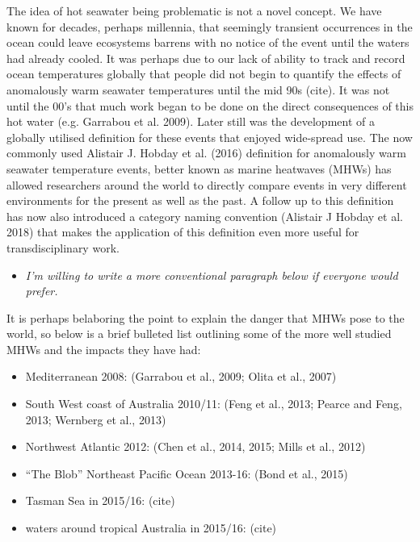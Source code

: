 \documentclass[]{article}
\providecommand{\tightlist}{%
  \setlength{\itemsep}{0pt}\setlength{\parskip}{0pt}}
\begin{document}
The idea of hot seawater being problematic is not a novel concept. We
have known for decades, perhaps millennia, that seemingly transient
occurrences in the ocean could leave ecosystems barrens with no notice
of the event until the waters had already cooled. It was perhaps due to
our lack of ability to track and record ocean temperatures globally that
people did not begin to quantify the effects of anomalously warm
seawater temperatures until the mid 90s (cite). It was not until the
00's that much work began to be done on the direct consequences of this
hot water (e.g. Garrabou et al. 2009). Later still was the development
of a globally utilised definition for these events that enjoyed
wide-spread use. The now commonly used Alistair J. Hobday et al. (2016)
definition for anomalously warm seawater temperature events, better
known as marine heatwaves (MHWs) has allowed researchers around the
world to directly compare events in very different environments for the
present as well as the past. A follow up to this definition has now also
introduced a category naming convention (Alistair J Hobday et al. 2018)
that makes the application of this definition even more useful for
transdisciplinary work.

\begin{itemize}
\tightlist
\item
  \emph{I'm willing to write a more conventional paragraph below if
  everyone would prefer.}
\end{itemize}

It is perhaps belaboring the point to explain the danger that MHWs pose
to the world, so below is a brief bulleted list outlining some of the
more well studied MHWs and the impacts they have had:

\begin{itemize}
\tightlist
\item
  Mediterranean 2008: (Garrabou et al., 2009; Olita et al., 2007)
\item
  South West coast of Australia 2010/11: (Feng et al., 2013; Pearce and
  Feng, 2013; Wernberg et al., 2013)
\item
  Northwest Atlantic 2012: (Chen et al., 2014, 2015; Mills et al., 2012)
\item
  ``The Blob'' Northeast Pacific Ocean 2013-16: (Bond et al., 2015)
\item
  Tasman Sea in 2015/16: (cite)
\item
  waters around tropical Australia in 2015/16: (cite)
\end{itemize}
\end{document}
